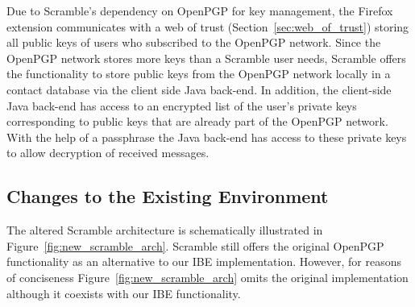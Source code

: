 Due to Scramble's dependency on OpenPGP for key management, the Firefox extension communicates with a web of trust (Section~\ref{sec:web_of_trust}) storing all public keys of users who subscribed to the OpenPGP network. Since the OpenPGP network stores more keys than a Scramble user needs, Scramble offers the functionality to store public keys from the OpenPGP network locally in a contact database via the client side Java back-end. In addition, the client-side Java back-end has access to an encrypted list of the user's private keys corresponding to public keys that are already part of the OpenPGP network. With the help of a passphrase the Java back-end has access to these private keys to allow decryption of received messages.

\subsection{Changes to the Existing Environment}
The altered Scramble architecture is schematically illustrated in Figure~\ref{fig:new_scramble_arch}. Scramble still offers the original OpenPGP functionality as an alternative to our IBE implementation. However, for reasons of conciseness Figure~\ref{fig:new_scramble_arch} omits the original implementation although it coexists with our IBE functionality.


